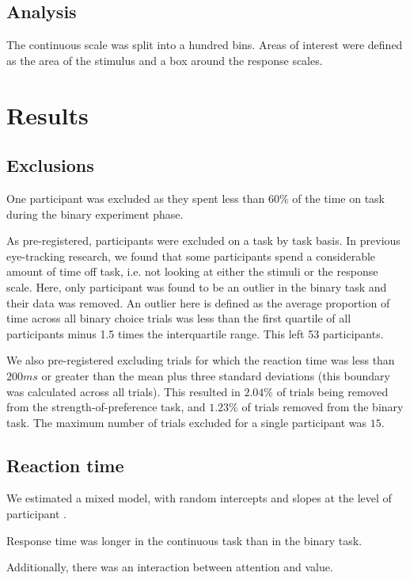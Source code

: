\documentclass[12pt]{article}
\begin{document}
\subsection{Analysis}
The continuous scale was split into a hundred bins. Areas of interest were defined as the area of the stimulus and a box around the response scales. 

\section{Results}

\subsection{Exclusions}
One participant was excluded as they spent less than 60\% of the time on task during the binary experiment phase. 

As pre-registered, participants were excluded on a task by task basis. In previous eye-tracking research, we found that some participants spend a considerable amount of time off task, i.e. not looking at either the stimuli or the response scale. Here, only participant was found to be an outlier in the binary task and their data was removed. An outlier here is defined as the average proportion of time across all binary choice trials was less than the first quartile of all participants minus 1.5 times the interquartile range. This left 53 participants. 

We also pre-registered excluding trials for which the reaction time was less than $200ms$ or greater than the mean plus three standard deviations (this boundary was calculated across all trials). This resulted in $2.04\%$ of trials being removed from the strength-of-preference task, and $1.23\%$ of trials removed from the binary task. The maximum number of trials excluded for a single participant was $15$. 

\subsection{Reaction time}
We estimated a mixed model, with random intercepts and slopes at the level of participant \cite{Barr:2013eh}.



Response time was longer in the continuous task than in the binary task. 

Additionally, there was an interaction between attention and value. 
\end{document}
